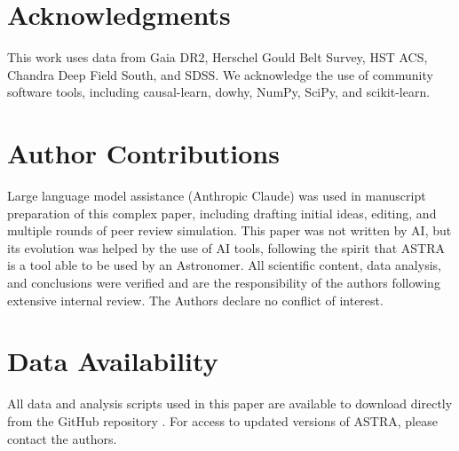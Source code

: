 \documentclass[usenatbib]{rasti}
\begin{document}
\section*{Acknowledgments}

This work uses data from Gaia DR2, Herschel Gould Belt Survey, HST ACS, Chandra Deep Field South, and SDSS. We acknowledge the use of community software tools, including causal-learn, dowhy, NumPy, SciPy, and scikit-learn.

\section*{Author Contributions}

Large language model assistance (Anthropic Claude) was used in manuscript preparation of this complex paper, including drafting initial ideas, editing, and multiple rounds of peer review simulation. This paper was not written by AI, but its evolution was helped by the use of AI tools, following the spirit that ASTRA is a tool able to be used by an Astronomer. All scientific content, data analysis, and conclusions were verified and are the responsibility of the authors following extensive internal review. The Authors declare no conflict of interest.

\section*{Data Availability}

All data and analysis scripts used in this paper are available to download directly from the GitHub repository \cite{astra_github}. For access to updated versions of ASTRA, please contact the authors.

\label{lastpage}



\end{document}
